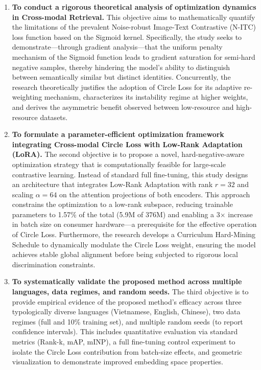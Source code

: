 \documentclass[../main.tex]{subfiles}
\begin{document}
\begin{enumerate}
    \item \textbf{To conduct a rigorous theoretical analysis of optimization dynamics in Cross-modal Retrieval.} This objective aims to mathematically quantify the limitations of the prevalent Noise-robust Image-Text Contrastive (N-ITC) loss function based on the Sigmoid kernel. Specifically, the study seeks to demonstrate---through gradient analysis---that the uniform penalty mechanism of the Sigmoid function leads to gradient saturation for semi-hard negative samples, thereby hindering the model's ability to distinguish between semantically similar but distinct identities. Concurrently, the research theoretically justifies the adoption of Circle Loss for its adaptive re-weighting mechanism, characterizes its instability regime at higher weights, and derives the asymmetric benefit observed between low-resource and high-resource datasets.

    \item \textbf{To formulate a parameter-efficient optimization framework integrating Cross-modal Circle Loss with Low-Rank Adaptation (LoRA).} The second objective is to propose a novel, hard-negative-aware optimization strategy that is computationally feasible for large-scale contrastive learning. Instead of standard full fine-tuning, this study designs an architecture that integrates Low-Rank Adaptation with rank $r{=}32$ and scaling $\alpha{=}64$ on the attention projections of both encoders. This approach constrains the optimization to a low-rank subspace, reducing trainable parameters to 1.57\% of the total (5.9M of 376M) and enabling a 3$\times$ increase in batch size on consumer hardware---a prerequisite for the effective operation of Circle Loss. Furthermore, the research develops a Curriculum Hard-Mining Schedule to dynamically modulate the Circle Loss weight, ensuring the model achieves stable global alignment before being subjected to rigorous local discrimination constraints.

    \item \textbf{To systematically validate the proposed method across multiple languages, data regimes, and random seeds.} The third objective is to provide empirical evidence of the proposed method's efficacy across three typologically diverse languages (Vietnamese, English, Chinese), two data regimes (full and 10\% training set), and multiple random seeds (to report confidence intervals). This includes quantitative evaluation via standard metrics (Rank-k, mAP, mINP), a full fine-tuning control experiment to isolate the Circle Loss contribution from batch-size effects, and geometric visualization to demonstrate improved embedding space properties.


\end{enumerate}
\end{document}
